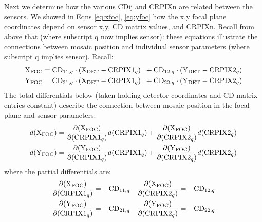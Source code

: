 \documentclass{article}
\begin{document}
Next we determine how the various CDij and CRPIXn are related between the sensors.
We showed in Eqns \ref{eq:xfoc}, \ref{eq:yfoc} how the x,y focal plane coordinates
depend on sensor x,y, CD matrix values, and CRPIXn. Recall from above that
(where subscript q now implies sensor):
these equations illustrate the connections between mosaic position and individual
sensor parameters (where subscript q implies sensor). Recall:
\begin{align*}
   \mathrm{X}_{\mathrm{FOC}} &= \mathrm{CD}_{11,q} \cdot (\mathrm{X}_{\mathrm{DET}} - \mathrm{CRPIX1}_q) \;\; + \mathrm{CD}_{12,q} \cdot (\mathrm{Y}_{\mathrm{DET}} - \mathrm{CRPIX2}_q) \\
   \mathrm{Y}_{\mathrm{FOC}} &= \mathrm{CD}_{21,q} \cdot (\mathrm{X}_{\mathrm{DET}} - \mathrm{CRPIX1}_q) \;\; + \mathrm{CD}_{22,q} \cdot (\mathrm{Y}_{\mathrm{DET}} - \mathrm{CRPIX2}_q)
\end{align*}
The total differentials below (taken holding detector coordinates and CD 
matrix entries constant) describe the connection between mosaic position in 
the focal plane and sensor parameters:
\begin{align}
   d(\mathrm{X}_{\mathrm{FOC}}) &= \frac{\partial (\mathrm{X}_{\mathrm{FOC}})}{\partial (\mathrm{CRPIX1}_q)} d(\mathrm{CRPIX1}_q) 
               + \frac{\partial (\mathrm{X}_{\mathrm{FOC}})}{\partial (\mathrm{CRPIX2}_q)} d(\mathrm{CRPIX2}_q) \\
   d(\mathrm{Y}_{\mathrm{FOC}}) &= \frac{\partial (\mathrm{Y}_{\mathrm{FOC}})}{\partial (\mathrm{CRPIX1}_q)} d(\mathrm{CRPIX1}_q) 
               + \frac{\partial (\mathrm{Y}_{\mathrm{FOC}})}{\partial (\mathrm{CRPIX2}_q)} d(\mathrm{CRPIX2}_q)
\end{align}
where the partial differentials are:
\begin{align*}
   \frac{\partial (\mathrm{X}_{\mathrm{FOC}})}{\partial (\mathrm{CRPIX1}_q)} &= -\mathrm{CD}_{11,q} &
   \frac{\partial (\mathrm{X}_{\mathrm{FOC}})}{\partial (\mathrm{CRPIX2}_q)} &= -\mathrm{CD}_{12,q} \\
   \frac{\partial (\mathrm{Y}_{\mathrm{FOC}})}{\partial (\mathrm{CRPIX1}_q)} &= -\mathrm{CD}_{21,q} &
   \frac{\partial (\mathrm{Y}_{\mathrm{FOC}})}{\partial (\mathrm{CRPIX2}_q)} &= -\mathrm{CD}_{22,q} \\
\end{align*}
\end{document}
